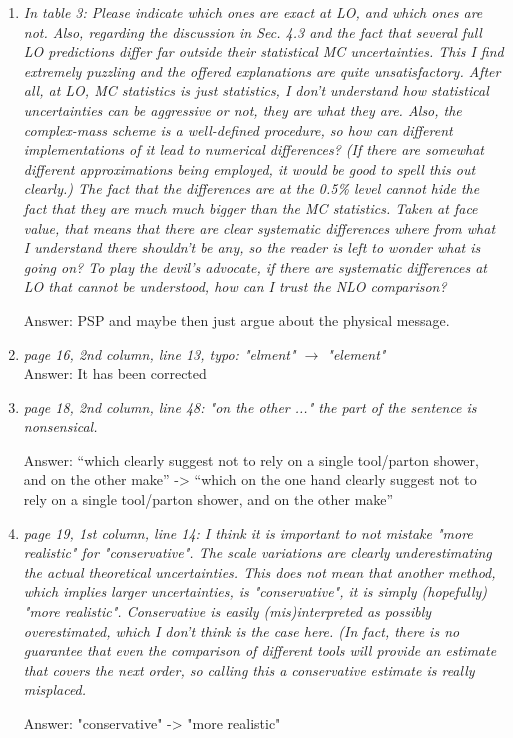 \documentclass{report}
\begin{document}
\begin{enumerate}
\item \emph{In table 3: Please indicate which ones are exact at LO, and which ones are not. Also, regarding the discussion in Sec. 4.3 and the fact that several full LO
predictions differ far outside their statistical MC uncertainties. This I find
extremely puzzling and the offered explanations are quite unsatisfactory. After
all, at LO, MC statistics is just statistics, I don't understand how statistical
uncertainties can be aggressive or not, they are what they are.
Also, the complex-mass scheme is a well-defined procedure, so how can different implementations of it lead to numerical differences? (If there are somewhat different approximations being employed, it would be good to spell this out clearly.) The fact that the differences are at the 0.5\% level
cannot hide the fact that they are much much bigger than the MC statistics.
Taken at face value, that means that there are clear systematic differences where from what I understand there shouldn't be any, so the reader is left to wonder what is going on? To play the devil's advocate, if there are systematic differences at LO that cannot be understood, how can I trust the NLO comparison?}

Answer: PSP and maybe then just argue about the physical message.

\item \emph{ page 16, 2nd column, line 13, typo: "elment" $\to$ "element"}\\
    
Answer: It has been corrected

\item \emph{ page 18, 2nd column, line 48: "on the other ..." the part of the sentence is
    nonsensical.}
    
Answer: ``which clearly suggest not to rely on a single tool/parton shower, and on the other make'' ->
    ``which on the one hand clearly suggest not to rely on a single tool/parton shower, and on the other make''
    
\item \emph{page 19, 1st column, line 14:
I think it is important to not mistake "more realistic" for "conservative". The
scale variations are clearly underestimating the actual theoretical uncertainties. This does not mean that another method, which implies larger uncertainties, is "conservative", it is simply (hopefully) "more realistic". Conservative is easily (mis)interpreted as possibly overestimated, which I don't think is the case here. (In fact, there is no guarantee that even the comparison of different tools will provide an estimate that covers the next order, so calling this a conservative estimate is really misplaced.}

Answer: "conservative" -> "more realistic" 

\end{enumerate}
\end{document}
